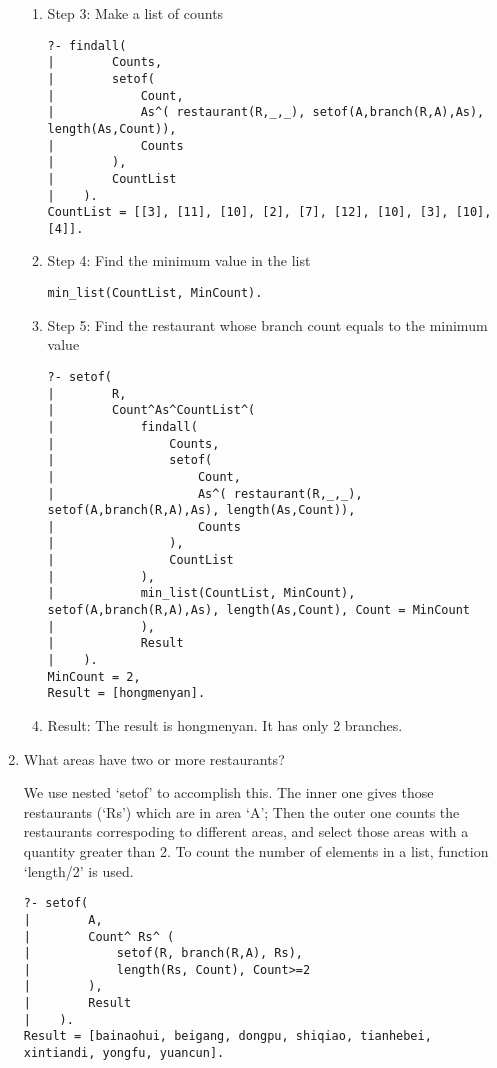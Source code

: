 ﻿\documentclass[a4paper, 11pt]{article}
\begin{document}
\begin{enumerate}
\begin{enumerate}
    \item Step 3: Make a list of counts
    \begin{lstlisting}
?- findall(
|        Counts,
|        setof(
|            Count,
|            As^( restaurant(R,_,_), setof(A,branch(R,A),As), length(As,Count)),
|            Counts
|        ),
|        CountList
|    ).
CountList = [[3], [11], [10], [2], [7], [12], [10], [3], [10],[4]].
    \end{lstlisting}
    
    \item Step 4: Find the minimum value in the list
    \begin{lstlisting}
min_list(CountList, MinCount).
    \end{lstlisting}
    
    \item Step 5: Find the restaurant whose branch count equals to the minimum value
    \begin{lstlisting}
?- setof(
|        R,
|        Count^As^CountList^(
|            findall(
|                Counts,
|                setof(
|                    Count,
|                    As^( restaurant(R,_,_), setof(A,branch(R,A),As), length(As,Count)),
|                    Counts
|                ),
|                CountList
|            ),
|            min_list(CountList, MinCount), setof(A,branch(R,A),As), length(As,Count), Count = MinCount
|            ),
|            Result
|    ).
MinCount = 2,
Result = [hongmenyan].
    \end{lstlisting}
    
    \item Result: The result is hongmenyan. It has only 2 branches.
\end{enumerate}


\item What areas have two or more restaurants?

We use nested `setof' to accomplish this. The inner one gives those restaurants (`Rs') which are in area `A'; Then the outer one counts the restaurants correspoding to different areas, and select those areas with a quantity greater than 2. To count the number of elements in a list, function `length/2' is used.
\begin{lstlisting}
?- setof(
|        A,
|        Count^ Rs^ (
|            setof(R, branch(R,A), Rs),
|            length(Rs, Count), Count>=2
|        ),
|        Result
|    ).
Result = [bainaohui, beigang, dongpu, shiqiao, tianhebei, xintiandi, yongfu, yuancun].
\end{lstlisting}


\end{enumerate}
\end{document}
